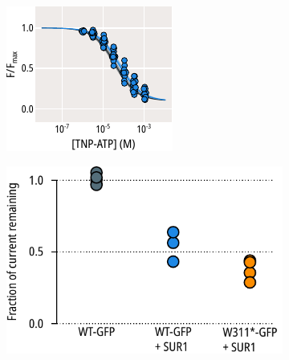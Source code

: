 \begin{figure}[h]
\begin{subfigure}[t]{0.35\textwidth}
	\end{subfigure}
	\vfill
	\begin{subfigure}[t]{0.35\textwidth}
		\caption{}\label{ch6fig:nosur_unroofed}
		\centering
		\includegraphics[width=\textwidth]{nosur_unroofed.pdf}
	\end{subfigure}
	\hfill
	\begin{subfigure}[t]{0.45\textwidth}
		\caption{}\label{ch6fig:tolb_inhibition_1}
		\centering
		\includegraphics[width=\textwidth]{tolb_inhibition_1.pdf}
	\end{subfigure}
	\vfill
	\begin{subfigure}[t]{0.9\textwidth}
		\caption{}\label{ch6fig:nosur_ec50s}

\end{subfigure}
\end{figure}
